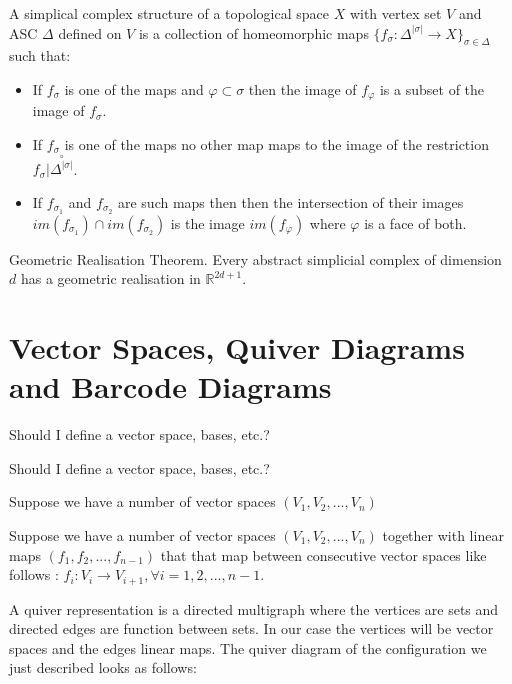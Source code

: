 
A simplical complex structure of a topological space $X$ with vertex set $V$ and ASC $\Delta$ defined on $V$ is a collection of homeomorphic maps $\{f_\sigma : \Delta^{|\sigma|} \to X\}_{\sigma \in \Delta}$ such that:


\begin{itemize}
    \item If $f_\sigma$ is one of the maps and $\varphi \subset \sigma$ then the image of $f_\varphi$ is a subset of the image of $f_\sigma$.
    \item If $f_\sigma$ is one of the maps no other map maps to the image of the restriction $f_\sigma | \overset{\circ}{\Delta^{|\sigma|}}$.
    \item If $f_{\sigma_1}$ and $f_{\sigma_2}$ are such maps then then the intersection of their images $im(f_{\sigma_1}) \cap im(f_{\sigma_2})$ is the image $im(f_\varphi)$ where $\varphi$ is a face of both. 

\end{itemize}




\begin{thm} Geometric Realisation Theorem. Every abstract simplicial complex of dimension $d$ has a geometric realisation in $\mathbb{R}^{2d+1}.$   \end{thm}



\section{Vector Spaces, Quiver Diagrams and Barcode Diagrams}

Should I define a vector space, bases, etc.?

Should I define a vector space, bases, etc.?


Suppose we have a number of vector spaces $(V_1, V_2, ...,V_n)$

Suppose we have a number of vector spaces $(V_1, V_2, ...,V_n)$ together with linear maps $(f_1, f_2, ...,f_{n-1})$ that that map between consecutive vector spaces like follows : $f_i: V_i \to V_{i+1}, \forall i = 1, 2, ..., n -1$. 

A quiver representation is a directed multigraph where the vertices are sets and directed edges are function between sets. In our case the vertices will be vector spaces and the edges linear maps. The quiver diagram of the configuration we just described looks as follows:

